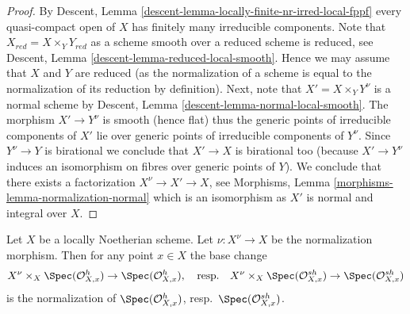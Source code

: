 \begin{proof}
By Descent, Lemma \ref{descent-lemma-locally-finite-nr-irred-local-fppf}
every quasi-compact open of $X$ has finitely many irreducible components.
Note that $X_{red} = X \times_Y Y_{red}$ as a scheme smooth over a reduced
scheme is reduced, see
Descent, Lemma \ref{descent-lemma-reduced-local-smooth}.
Hence we may assume that $X$ and $Y$ are reduced (as the normalization
of a scheme is equal to the normalization of its reduction by
definition). Next, note that $X' = X \times_Y Y^\nu$ is a normal scheme
by Descent, Lemma \ref{descent-lemma-normal-local-smooth}.
The morphism $X' \to Y^\nu$ is smooth (hence flat) thus the generic
points of irreducible components of $X'$ lie over generic points of
irreducible components of $Y^\nu$. Since $Y^\nu \to Y$ is birational
we conclude that $X' \to X$ is birational too (because $X' \to Y^\nu$
induces an isomorphism on fibres over generic points of $Y$).
We conclude that there exists a factorization
$X^\nu \to X' \to X$, see
Morphisms, Lemma \ref{morphisms-lemma-normalization-normal}
which is an isomorphism as $X'$ is normal and integral over $X$.
\end{proof}

\begin{lemma}
\label{lemma-normalization-and-henselization}
Let $X$ be a locally Noetherian scheme. Let $\nu : X^\nu \to X$
be the normalization morphism. Then for any point $x \in X$
the base change
$$
X^\nu \times_X \Spec(\mathcal{O}_{X, x}^h) \to \Spec(\mathcal{O}_{X, x}^h),
\quad\text{resp.}\quad
X^\nu \times_X \Spec(\mathcal{O}_{X, x}^{sh}) \to \Spec(\mathcal{O}_{X, x}^{sh})
$$
is the normalization of $\Spec(\mathcal{O}_{X, x}^h)$,
resp.\ $\Spec(\mathcal{O}_{X, x}^{sh})$.
\end{lemma}

